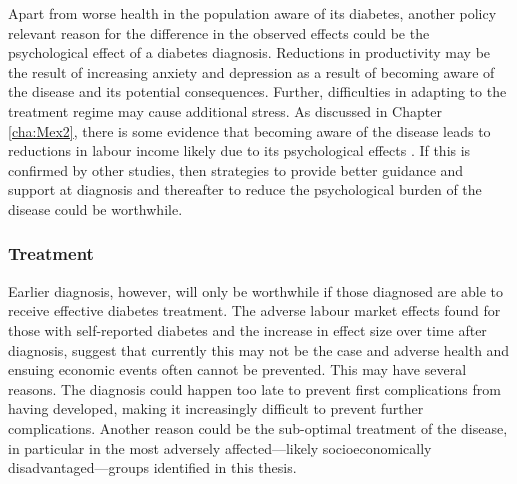 Apart from worse health in the population aware of its diabetes, another policy relevant reason for the difference in the observed effects could be the psychological effect of a diabetes diagnosis. Reductions in productivity may be the result of increasing anxiety and depression as a result of becoming aware of the disease and its potential consequences. Further, difficulties in adapting to the treatment regime may cause additional stress. As discussed in Chapter \ref{cha:Mex2}, there is some evidence that becoming aware of the disease leads to reductions in labour income likely due to its psychological effects \parencite{Liu2014}. If this is confirmed by other studies, then strategies to provide better guidance and support at diagnosis and thereafter to reduce the psychological burden of the disease could be worthwhile.



\subsubsection{Treatment}

Earlier diagnosis, however, will only be worthwhile if those diagnosed are able to receive effective diabetes treatment. The adverse labour market effects found for those with self-reported diabetes and the increase in effect size over time after diagnosis, suggest that currently this may not be the case and adverse health and ensuing economic events often cannot be prevented. This may have several reasons. The diagnosis could happen too late to prevent first complications from having developed, making it increasingly difficult to prevent further complications. Another reason could be the sub-optimal treatment of the disease, in particular in the most adversely affected---likely socioeconomically disadvantaged---groups identified in this thesis.

